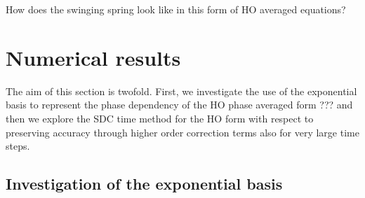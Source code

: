 \documentclass[a4,12pt]{article}
\newcommand{\black}{\color{black}}
\begin{document}
\color{red}
How does the swinging spring look like in this form of HO averaged equations?

 
 
\bigskip


\black


\section{Numerical results}

The aim of this section is twofold. First, we investigate the use of the exponential basis to represent the phase dependency of the HO phase averaged form ??? and then we explore the SDC time method for the HO form with respect to preserving accuracy through higher order correction terms also for very large time steps.

\subsection{Investigation of the exponential basis}
\end{document}
